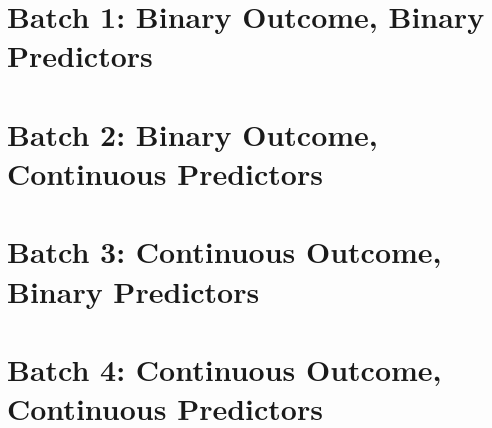 
\section[Binary Y, binary X]{Batch 1: Binary Outcome, Binary Predictors}
 \newpage
 \newpage 
 \newpage

 \newpage
 \newpage 
 \newpage

\section[Binary Y, continuous X]{Batch 2: Binary Outcome, Continuous Predictors}
 \newpage
 \newpage 
 \newpage

 \newpage
 \newpage 
 \newpage

\section[Continuous Y, binary X]{Batch 3: Continuous Outcome, Binary Predictors}
 \newpage
 \newpage 
 \newpage

\section[Continuous Y, continuous X]{Batch 4: Continuous Outcome, Continuous Predictors}
 \newpage 
 \newpage 
 \newpage
